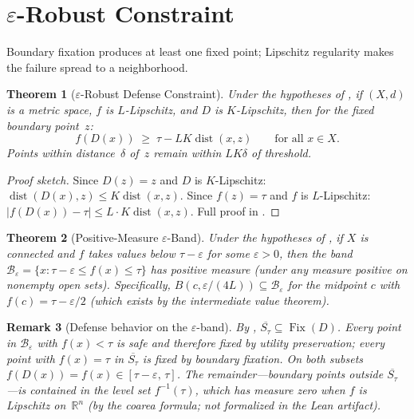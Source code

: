 \documentclass[11pt]{article}
\newtheorem{theorem}{Theorem}[section]
\newtheorem{remark}[theorem]{Remark}
\newcommand{\R}{\mathbb{R}}
\newcommand{\cl}[1]{\overline{#1}}
\newcommand{\Fix}{\operatorname{Fix}}
\newcommand{\dist}{\operatorname{dist}}
\begin{document}
\section{$\varepsilon$-Robust Constraint}
\label{sec:eps-robust}

Boundary fixation produces at least one fixed point; Lipschitz
regularity makes the failure spread to a neighborhood.

\begin{theorem}[$\varepsilon$-Robust Defense Constraint]
\label{thm:eps-robust}
Under the hypotheses of , if $(X,d)$ is a metric
space, $f$ is $L$-Lipschitz, and $D$ is $K$-Lipschitz, then for
the fixed boundary point~$z$:
\begin{equation}
  f(D(x)) \;\geq\; \tau - LK\dist(x, z)
  \qquad \text{for all } x \in X.
\end{equation}
Points within distance~$\delta$ of~$z$ remain within
$LK\delta$ of threshold.
\end{theorem}

\begin{proof}[Proof sketch]
Since $D(z)=z$ and $D$ is $K$-Lipschitz:
$\dist(D(x),z) \leq K\dist(x,z)$. Since $f(z)=\tau$ and $f$ is
$L$-Lipschitz:
$|f(D(x)) - \tau| \leq L \cdot K\dist(x,z)$.
Full proof in .
\end{proof}

\begin{theorem}[Positive-Measure $\varepsilon$-Band]
\label{thm:band-measure}
Under the hypotheses of , if $X$ is connected
and $f$ takes values below $\tau - \varepsilon$ for some
$\varepsilon > 0$, then the band
$\mathcal{B}_\varepsilon = \{x : \tau - \varepsilon \leq f(x)
\leq \tau\}$ has positive measure (under any measure positive on
nonempty open sets).
Specifically, $B(c, \varepsilon/(4L)) \subseteq
\mathcal{B}_\varepsilon$ for the midpoint $c$ with
$f(c) = \tau - \varepsilon/2$ (which exists by the intermediate
value theorem).
\end{theorem}

\begin{remark}[Defense behavior on the $\varepsilon$-band]
By , $\cl{S_\tau} \subseteq \Fix(D)$. Every point in $\mathcal{B}_\varepsilon$ with $f(x) < \tau$ is safe and therefore fixed by utility preservation; every point with $f(x) = \tau$ in
  $\cl{S_\tau}$ is fixed by boundary fixation. On both subsets $f(D(x)) = f(x) \in [\tau - \varepsilon,\, \tau]$. The remainder---boundary points outside $\cl{S_\tau}$---is contained in the level set $f^{-1}(\tau)$,
  which has measure zero when $f$ is Lipschitz on~$\R^n$ (by the coarea formula; not formalized in the Lean artifact).
\end{remark}
\end{document}
